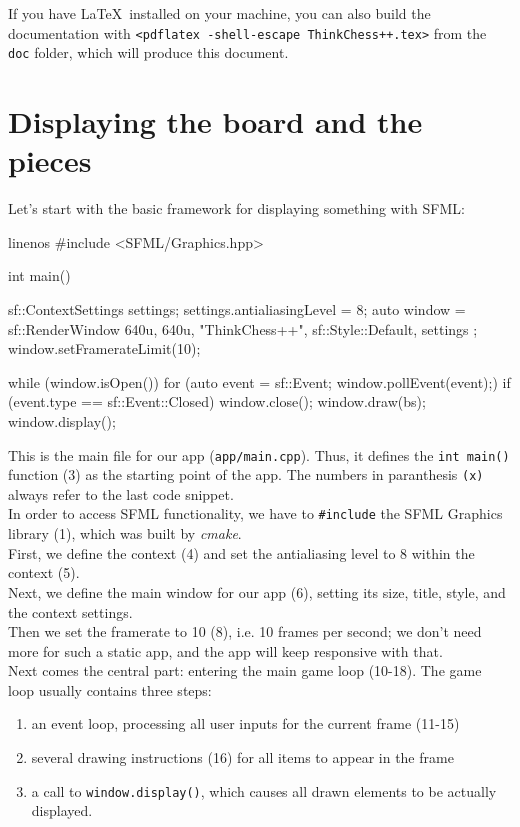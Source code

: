 If you have \LaTeX\ installed on your machine, you can also build the documentation
with \texttt{<pdflatex -shell-escape ThinkChess++.tex>} from the \texttt{doc} folder,
which will produce this document.

\section{Displaying the board and the pieces}

Let's start with the basic framework for displaying something with SFML:

\begin{cpp*}{linenos}
#include <SFML/Graphics.hpp>

int main() {
  sf::ContextSettings settings;
  settings.antialiasingLevel = 8;
  auto window = sf::RenderWindow{ {640u, 640u}, "ThinkChess++",
              sf::Style::Default, settings };
  window.setFramerateLimit(10);

  while (window.isOpen()) {
    for (auto event = sf::Event{}; window.pollEvent(event);) {
      if (event.type == sf::Event::Closed) {
        window.close();
      }
    }
    window.draw(bs);
    window.display();
  }
}
\end{cpp*}

This is the main file for our app (\texttt{app/main.cpp}).
Thus, it defines the \texttt{int main()} function (3) as the starting point of the app.
The numbers in paranthesis \texttt{(x)} always refer to the last code snippet.\\
In order to access SFML functionality, we have to \texttt{#include} the SFML Graphics
library (1), which was built by \emph{cmake}.\\
First, we define the context (4) and set the antialiasing level to 8 within the context (5).\\
Next, we define the main window for our app (6), setting its size, title, style, and the context
settings.\\
Then we set the framerate to 10 (8), i.e. 10 frames per second; we don't need more
for such a static app, and the app will keep responsive with that.\\
Next comes the central part: entering the main game loop (10-18). The game loop usually contains
three steps:

\begin{enumerate}
  \item an event loop, processing all user inputs for the current frame (11-15)
  \item several drawing instructions (16) for all items to appear in the frame
  \item a call to \texttt{window.display()}, which causes all drawn elements to be
    actually displayed.
\end{enumerate}


